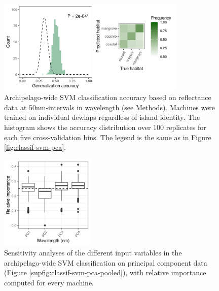 \begin{figure}[H]
	\centering
	\includegraphics[width=0.8\textwidth]{suppfigures/classif_svm_refl_pooled.png}
	\caption{Archipelago-wide SVM classification accuracy based on reflectance data at 50nm-intervals in wavelength (see Methods). Machines were trained on individual dewlaps regardless of island identity. The histogram shows the accuracy distribution over 100 replicates for each five cross-validation bins. The legend is the same as in Figure \ref{fig:classif-svm-pca}.}
	\label{supfig:classif-svm-refl-pooled}
\end{figure}

\begin{figure}[H]
	\centering
	\includegraphics[width=0.4\textwidth]{suppfigures/importance_svm_pca_pooled.png}
	\caption{Sensitivity analyses of the different input variables in the archipelago-wide SVM classification on principal component data (Figure \ref{supfig:classif-svm-pca-pooled}), with relative importance computed for every machine.}
	\label{supfig:importance-svm-pca-pooled}
\end{figure}

